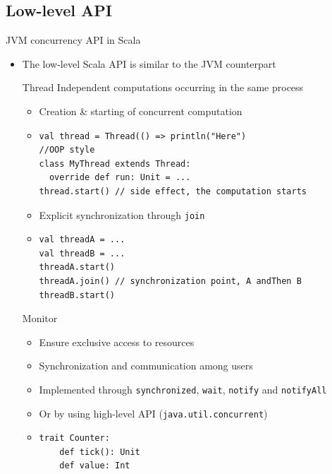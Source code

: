 \documentclass[presentation, 9pt]{beamer}\mode<presentation>{\usetheme{AMSBolognaFC}}
\begin{document}
\subsection{Low-level API}
\begin{frame}{JVM concurrency API in Scala}
	\begin{itemize}
		\item The low-level Scala API is similar to the JVM counterpart
  	\begin{alertblock}{Thread}
			Independent computations occurring in the same process 
			\begin{itemize}
				\item Creation \& starting of concurrent computation
    		\item[] \begin{tcolorbox}[left=0pt, top=0pt, bottom=0pt]
					\begin{verbatim}
val thread = Thread(() => println("Here")
//OOP style
class MyThread extends Thread:
  override def run: Unit = ...
thread.start() // side effect, the computation starts
					\end{verbatim}
				\end{tcolorbox}

				\item Explicit synchronization through \texttt{join}
				\item[] \begin{tcolorbox}[left=0pt, top=0pt, bottom=0pt]
					\begin{verbatim}
val threadA = ...
val threadB = ...
threadA.start()
threadA.join() // synchronization point, A andThen B
threadB.start()
					\end{verbatim}
				\end{tcolorbox}
			\end{itemize}
		\end{alertblock}
		\begin{alertblock}{Monitor}
			\begin{itemize}
				\item Ensure exclusive access to resources 
				\item Synchronization and communication among users
    		\item Implemented through \texttt{synchronized}, \texttt{wait}, \texttt{notify} and \texttt{notifyAll}
      	\item Or by using high-level API (\texttt{java.util.concurrent})
    		\item[] \begin{tcolorbox}[left=0pt, top=0pt, bottom=0pt]
					\begin{verbatim}
trait Counter:
	def tick(): Unit
	def value: Int


\end{verbatim}
\end{tcolorbox}
\end{itemize}
\end{alertblock}
\end{itemize}
\end{frame}
\end{document}
